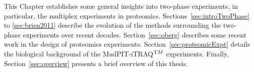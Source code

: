 
This Chapter establishes some general insights into two-phase experiments, in particular, the multiplex experiments in proteomics. Sections~\ref{sec:introTwoPhase} to \ref{sec:brien2011} describe the evolution of the methods surrounding the two-phase experiments over recent decades. Section~\ref{sec:oberg} describes some recent work in the design of proteomics experiments. Section~\ref{sec:proteomicExpt} details the biological background of the MudPIT-iTRAQ$^{\textrm TM}$ experiments. Finally, Section~\ref{sec:overview} presents a brief overview of this thesis.

